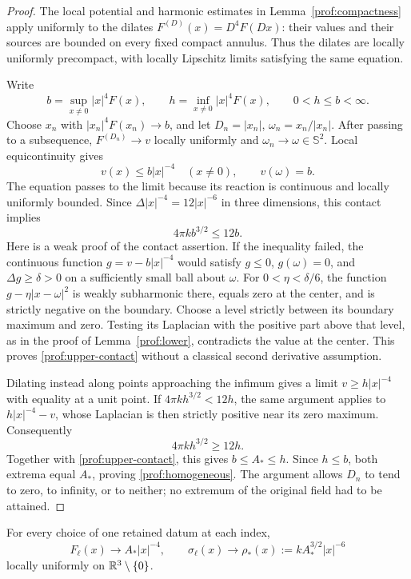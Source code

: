 \begin{proof}
The local potential and harmonic estimates in
Lemma~\ref{prof:compactness} apply uniformly to the dilates
$F^{(D)}(x)=D^4F(Dx)$: their values and their sources are bounded on
every fixed compact annulus.  Thus the dilates are locally uniformly
precompact, with locally Lipschitz limits satisfying the same
equation.

Write
\[
 b=\sup_{x\ne0}|x|^4F(x),\qquad
 h=\inf_{x\ne0}|x|^4F(x),
 \qquad 0<h\le b<\infty.
\]
Choose $x_n$ with $|x_n|^4F(x_n)\to b$, and let
$D_n=|x_n|$, $\omega_n=x_n/|x_n|$.  After passing to a subsequence,
$F^{(D_n)}\to v$ locally uniformly and $\omega_n\to\omega\in\mathbb S^2$.
Local equicontinuity gives
\[
 v(x)\le b|x|^{-4}\quad(x\ne0),\qquad v(\omega)=b.
\]
The equation passes to the limit because its reaction is continuous
and locally uniformly bounded.  Since
$\Delta |x|^{-4}=12|x|^{-6}$ in three dimensions, this contact implies
\begin{equation}
\label{prof:upper-contact}
 4\pi k b^{3/2}\le12b.
\end{equation}
Here is a weak proof of the contact assertion.  If the inequality
failed, the continuous function $g=v-b|x|^{-4}$ would satisfy
$g\le0$, $g(\omega)=0$, and $\Delta g\ge\delta>0$ on a sufficiently
small ball about $\omega$.  For $0<\eta<\delta/6$, the function
$g-\eta|x-\omega|^2$ is weakly subharmonic there, equals zero at the
center, and is strictly negative on the boundary.  Choose a level
strictly between its boundary maximum and zero.  Testing its
Laplacian with the positive part above that level, as in the proof of
Lemma~\ref{prof:lower}, contradicts the value at the center.
This proves \eqref{prof:upper-contact} without a classical second
derivative assumption.

Dilating instead along points approaching the infimum gives a limit
$v\ge h|x|^{-4}$ with equality at a unit point.  If
$4\pi k h^{3/2}<12h$, the same argument applies to
$h|x|^{-4}-v$, whose Laplacian is then strictly positive near its zero
maximum.  Consequently
\[
 4\pi k h^{3/2}\ge12h.
\]
Together with \eqref{prof:upper-contact}, this gives
$b\le A_*\le h$.  Since $h\le b$, both extrema equal $A_*$, proving
\eqref{prof:homogeneous}.  The argument allows $D_n$ to tend to zero,
to infinity, or to neither; no extremum of the original field had to
be attained.
\end{proof}

\begin{proposition}
\label{prof:limit}
For every choice of one retained datum at each index,
\[
 F_\ell(x)\longrightarrow A_*|x|^{-4},\qquad
 \sigma_\ell(x)\longrightarrow
 \rho_*(x):=kA_*^{3/2}|x|^{-6}
\]
locally uniformly on $\mathbb R^3\setminus\{0\}$.
\end{proposition}

